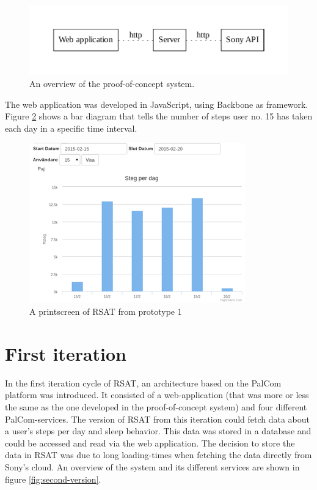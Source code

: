 \documentclass{cslthse-msc}
\begin{document}
\begin{figure}[!hbt]
\centering
\includegraphics[scale=0.8]{firs_verison.pdf} 
\caption{An overview of the proof-of-concept system.}\label{fig:firstV}
\end{figure}

The web application was developed in JavaScript, using Backbone as framework. Figure \ref{fig:firstV_screen} shows a bar diagram that tells the number of steps user no. 15 has taken each day in a specific time interval.

\begin{figure}[!hbt]
\centering
\includegraphics[scale=0.8]{first_prototype_screenshot_crop2.png} 
\caption{A printscreen of RSAT from prototype 1}\label{fig:firstV_screen}
\end{figure}


\section{First iteration}
In the first iteration cycle of RSAT, an architecture based on the PalCom platform was introduced.  It consisted of a web-application (that was more or less the same as the one developed in the proof-of-concept system) and four different PalCom-services. The version of RSAT from this iteration could fetch data about a user’s steps per day and sleep behavior. This data was stored in a database and could be accessed and read via the web application. The decision to store the data in RSAT was due to long loading-times when fetching the data directly from Sony's cloud.
An overview of the system and its different services are shown in figure \ref{fig:second-version}.  
\end{document}
